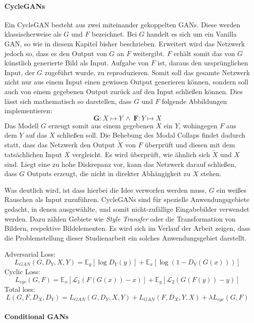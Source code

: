 \paragraph{CycleGANs}
Ein \ac{CycleGAN} besteht aus zwei miteinander gekoppelten \acp{GAN}. Diese werden klassischerweise als $G$ und $F$ bezeichnet. Bei $G$ handelt es sich um ein Vanilla \ac{GAN}, so wie in diesem Kapitel bisher beschrieben. Erweitert wird das Netzwerk jedoch so, dass es den Output von $G$ an $F$ weitergibt. $F$ erhält somit das von $G$ künstlich generierte Bild als Input. Aufgabe von $F$ ist, daraus den ursprünglichen Input, der $G$ zugeführt wurde, zu reproduzieren. Somit soll das gesamte Netzwerk nicht nur aus einem Input einen gewissen Output generieren können, sondern soll auch von einem gegebenen Output zurück auf den Input schließen können. Dies lässt sich mathematisch so darstellen, dass $G$ und $F$ folgende Abbildungen implementieren:
\begin{equation}
	\mathbf{G}: X\mapsto Y \: \wedge \: \mathbf{F}: Y\mapsto X
\end{equation}
Das Modell $G$ erzeugt somit aus einem gegebenen $X$ ein $Y$, wohingegen $F$ aus dem $Y$ auf das $X$ schließen soll. Die Behebung des Modal Collaps findet dadurch statt, dass das Netzwerk den Output $\tilde{X}$ von $F$ überprüft und diesen mit dem tatsächlichen Input $X$ vergleicht. Es wird überprüft, wie ähnlich sich $\tilde{X}$ und $X$ sind. Liegt eine zu hohe Diskrepanz vor, kann das Netzwerk darauf schließen, dass $G$ Outputs erzeugt, die nicht in direkter Abhängigkeit zu $X$ stehen. 

Was deutlich wird, ist dass hierbei die Idee verworfen werden muss, $G$ ein weißes Rauschen als Input zuzuführen. \acp{CycleGAN} sind für spezielle Anwendungsgebiete gedacht, in denen ausgewählte, und somit nicht-zufällige Eingabebilder verwendet werden. Dazu zählen Gebiete wie \emph{Style Transfer} oder die Transformation von Bildern, respektive Bildelementen. Es wird sich im Verlauf der Arbeit zeigen, dass die Problemstellung dieser Studienarbeit ein solches Anwendungsgebiet darstellt.

Adversarial Loss:
\begin{equation}
	L_{GAN}(G, D_Y, X, Y) = \mathbb{E}_y[\log{D_Y(y)}] + \mathbb{E}_x[\log(1-D_Y(G(x)))]
\end{equation}
Cyclic Loss:
\begin{equation}
	L_{cyc}(G, F) = \mathbb{E}_x[\mathcal{L}_{1}(F(G(x))-x)] + \mathbb{E}_y[\mathcal{L}_{2}(G(F(y))-y)]
\end{equation}
Total loss:
\begin{equation}
	L(G, F, D_X, D_Y) = L_{GAN}(G, D_Y, X, Y) + L_{GAN}(F, D_X, Y, X) + \lambda L_{cyc}(G, F)
\end{equation}
\cite{cycleGAN}


\paragraph{Conditional GANs}

\cite{DeepLearningBook}
\cite{visualApproach}